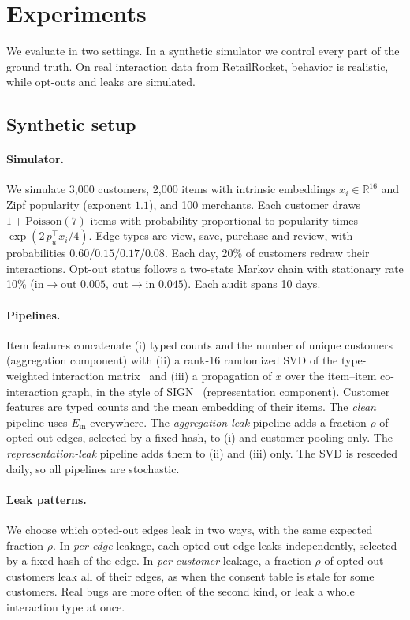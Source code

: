 \documentclass[10pt,twocolumn,letterpaper]{article}
\theoremstyle{definition}
\newcommand{\Ein}{E_{\mathrm{in}}}
\begin{document}
\section{Experiments}\label{sec:exp}
We evaluate in two settings. In a synthetic simulator we control every part
of the ground truth. On real interaction data from RetailRocket, behavior is
realistic, while opt-outs and leaks are simulated.

\subsection{Synthetic setup}\label{sec:synth}
\paragraph{Simulator.}
We simulate 3{,}000 customers, 2{,}000 items with intrinsic embeddings
$x_i\in\mathbb{R}^{16}$ and Zipf popularity (exponent $1.1$), and 100 merchants. Each
customer draws $1+\mathrm{Poisson}(7)$ items with probability proportional to
popularity times $\exp(2\,p_u^\top x_i/4)$. Edge types are view, save, purchase
and review, with probabilities $0.60/0.15/0.17/0.08$. Each day, 20\% of customers
redraw their interactions. Opt-out status follows a two-state Markov chain
with stationary rate 10\% (in$\to$out $0.005$, out$\to$in $0.045$). Each audit spans 10 days.

\paragraph{Pipelines.}
Item features concatenate (i) typed counts and the number of unique customers
(aggregation component) with (ii) a rank-16 randomized SVD of the
type-weighted interaction matrix~\citep{halko2011finding} and (iii) a propagation
of $x$ over the item--item co-interaction graph, in the style of
SIGN~\citep{frasca2020sign} (representation component). Customer features are typed counts
and the mean embedding of their items. The \emph{clean} pipeline uses $\Ein$
everywhere. The \emph{aggregation-leak} pipeline adds a fraction $\rho$ of opted-out
edges, selected by a fixed hash, to (i) and customer pooling only. The
\emph{representation-leak} pipeline adds them to (ii) and (iii) only. The SVD is reseeded
daily, so all pipelines are stochastic.

\paragraph{Leak patterns.}
We choose which opted-out edges leak in two ways, with the same expected
fraction $\rho$. In \emph{per-edge} leakage, each opted-out edge leaks independently,
selected by a fixed hash of the edge. In \emph{per-customer} leakage, a fraction
$\rho$ of opted-out customers leak all of their edges, as when the consent table is
stale for some customers. Real bugs are more often of the second kind, or leak
a whole interaction type at once.
\end{document}
